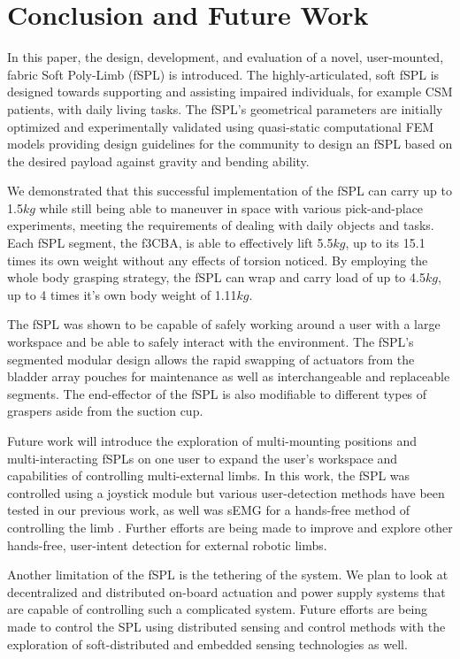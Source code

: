 \documentclass[letterpaper, 10 pt, conference]{ieeeconf}  %
\begin{document}
\section{Conclusion and Future Work}

In this paper, the design, development, and evaluation of a novel, user-mounted, fabric Soft Poly-Limb (fSPL) is introduced. The highly-articulated, soft fSPL is designed towards supporting and assisting impaired individuals, for example CSM patients, with daily living tasks. The fSPL’s geometrical parameters are initially optimized and experimentally validated using quasi-static computational FEM models providing design guidelines for the community to design an fSPL based on the desired payload against gravity and bending ability.

We demonstrated that this successful implementation of the fSPL can carry up to 1.5$kg$ while still being able to maneuver in space with various pick-and-place experiments, meeting the requirements of dealing with daily objects and tasks. Each fSPL segment, the f3CBA, is able to effectively lift 5.5$kg$, up to its 15.1 times its own weight without any effects of torsion noticed. By employing the whole body grasping strategy, the fSPL can wrap and carry load of up to 4.5$kg$, up to 4 times it’s own body weight of 1.11$kg$.

The fSPL was shown to be capable of safely working around a user with a large workspace and be able to safely interact with the environment. The fSPL’s segmented modular design allows the rapid swapping of actuators from the bladder array pouches for maintenance as well as interchangeable and replaceable segments. The end-effector of the fSPL is also modifiable to different types of graspers aside from the suction cup.

Future work will introduce the exploration of multi-mounting positions and multi-interacting fSPLs on one user to expand the user’s workspace and capabilities of controlling multi-external limbs. In this work, the fSPL was controlled using a joystick module but various user-detection methods have been tested in our previous work, as well was sEMG for a hands-free method of controlling the limb \cite{Nguyen2018}. Further efforts are being made to improve and explore other hands-free, user-intent detection for external robotic limbs.

Another limitation of the fSPL is the tethering of the system. We plan to look at decentralized and distributed on-board actuation and power supply systems that are capable of controlling such a complicated system. Future efforts are being made to control the SPL using distributed sensing and control methods \cite{Wenlong2018} with the exploration of soft-distributed and embedded sensing technologies as well. 
\end{document}
